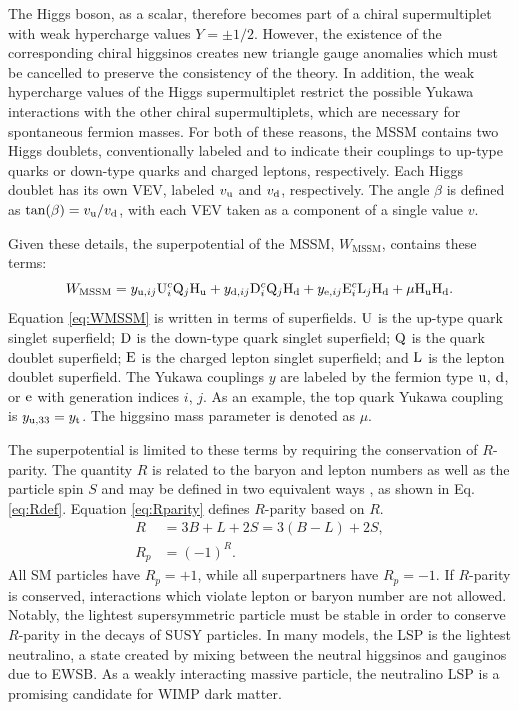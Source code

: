 The Higgs boson, as a scalar, therefore becomes part of a chiral supermultiplet with weak hypercharge values $Y = \pm 1/2$. However, the existence of the corresponding chiral higgsinos creates new triangle gauge anomalies which must be cancelled to preserve the consistency of the theory. In addition, the weak hypercharge values of the Higgs supermultiplet restrict the possible Yukawa interactions with the other chiral supermultiplets, which are necessary for spontaneous fermion masses. For both of these reasons, the MSSM contains two Higgs doublets, conventionally labeled \Hone and \Htwo to indicate their couplings to up-type quarks or down-type quarks and charged leptons, respectively. Each Higgs doublet has its own VEV, labeled $v_{\mathrm{u}}$ and $v_{\mathrm{d}}$, respectively. The angle $\beta$ is defined as $\text{tan}(\beta) = v_{\mathrm{u}}/v_{\mathrm{d}}$, with each VEV taken as a component of a single value $v$.

Given these details, the superpotential of the MSSM, $W_{\text{MSSM}}$, contains these terms:
\begin{equation}
W_{\text{MSSM}} = y_{\mathrm{u},ij}\mathrm{U}_{i}^{c}\mathrm{Q}_{j}\mathrm{H}_\mathrm{u} + y_{\mathrm{d},ij}\mathrm{D}_{i}^{c}\mathrm{Q}_{j}\mathrm{H}_\mathrm{d} + y_{\mathrm{e},ij}\mathrm{E}_{i}^{c}\mathrm{L}_{j}\mathrm{H}_\mathrm{d} + \mu \mathrm{H}_\mathrm{u} \mathrm{H}_\mathrm{d}. \label{eq:WMSSM}
\end{equation}
Equation \eqref{eq:WMSSM} is written in terms of superfields. $\mathrm{U}$ is the up-type quark singlet superfield; $\mathrm{D}$ is the down-type quark singlet superfield; $\mathrm{Q}$ is the quark doublet superfield; $\mathrm{E}$ is the charged lepton singlet superfield; and $\mathrm{L}$ is the lepton doublet superfield. The Yukawa couplings $y$ are labeled by the fermion type $\mathrm{u}$, $\mathrm{d}$, or $\mathrm{e}$ with generation indices $i$, $j$. As an example, the top quark Yukawa coupling is $y_{\mathrm{u},33} = y_{\mathrm{t}}$. The higgsino mass parameter is denoted as $\mu$.

The superpotential is limited to these terms by requiring the conservation of $R$-parity. The quantity $R$ is related to the baryon and lepton numbers as well as the particle spin $S$ and may be defined in two equivalent ways \cite{Barbier}, as shown in Eq. \eqref{eq:Rdef}. Equation \eqref{eq:Rparity} defines $R$-parity based on $R$.
\begin{align}
R &= 3B+L+2S = 3(B-L)+2S, \label{eq:Rdef} \\
R_{p} &= (-1)^{R}. \label{eq:Rparity}
\end{align}
All SM particles have $R_{p} = +1$, while all superpartners have $R_{p} = -1$. If $R$-parity is conserved, interactions which violate lepton or baryon number are not allowed. Notably, the lightest supersymmetric particle must be stable in order to conserve $R$-parity in the decays of SUSY particles. In many models, the LSP is the lightest neutralino, a state created by mixing between the neutral higgsinos and gauginos due to EWSB. As a weakly interacting massive particle, the neutralino LSP is a promising candidate for WIMP dark matter.

